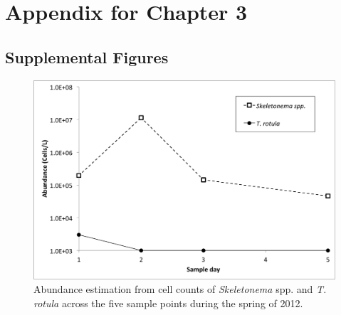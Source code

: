 \section{Appendix for Chapter 3}
\subsection{Supplemental Figures}

\begin{figure}[h!]
  \centering
    \includegraphics[width=1\textwidth]{Images/C3_SFigure1_CellCounts.png}
    \caption[Cell counts in Narragansett Bay during the spring of 2012]{Abundance estimation from cell counts of \textit{Skeletonema} spp. and \textit{T. rotula} across the five sample points during the spring of 2012. }
  \label{fig:a3f1}
\end{figure}


